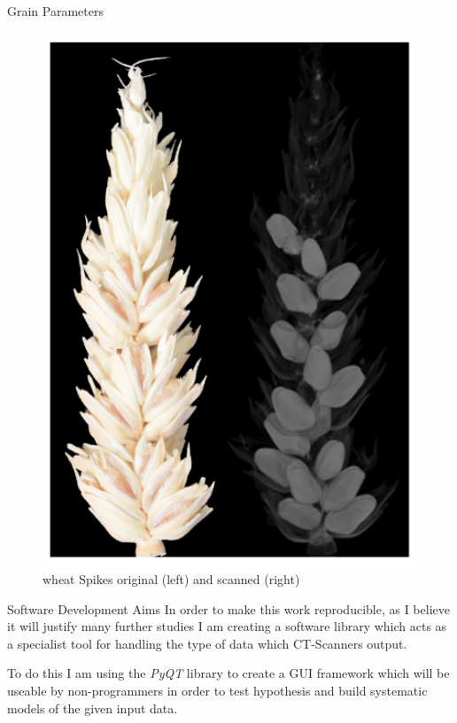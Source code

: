 \documentclass[final]{beamer}
\begin{document}
\begin{frame}{}
\begin{textblock}{27.7}
\begin{block}{Grain Parameters}
\begin{multicols}{2}
        \begin{figure}[htb]
          \centering
          \includegraphics[width=11.5cm]{collection.png}
          \caption{\label{fig:3d} wheat Spikes original (left) and scanned (right)}
        \end{figure}        
        
      \end{multicols}
      
    \end{block}

    \begin{block}{Software Development Aims}
      In order to make this work reproducible, as I believe it will justify many further studies
      I am creating a software library which acts as a specialist tool for handling the type of data
      which CT-Scanners output.

      To do this I am using the \textit{PyQT} library to create a GUI framework which will be useable
      by non-programmers in order to test hypothesis and build systematic models of the given input
      data. 
    \end{block}


\end{textblock}
\end{frame}
\end{document}
